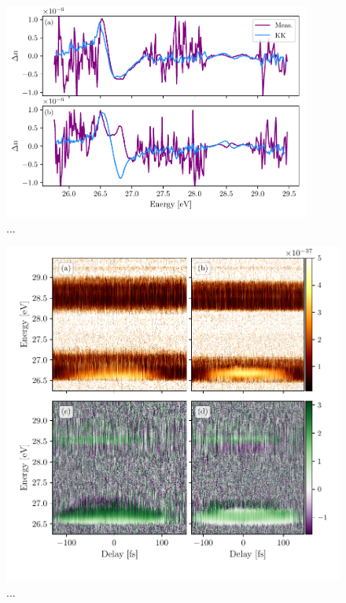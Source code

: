 \begin{figure}
	\centering
	\includegraphics[width=0.9\textwidth]{figures/CATS/dn_kk_lineout.pdf}
	\caption[...]{...}
	\label{fig:dn_kk_lineout}
\end{figure}


\begin{figure}
	\centering
	\includegraphics[width=1.0\textwidth]{figures/CATS/amp_ph_delay.pdf}
	\caption[...]{...}
	\label{fig:amp_ph_delay}
\end{figure}

